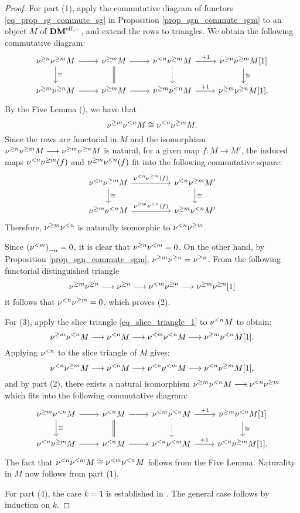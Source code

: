 \begin{proof}
For part (1), apply the commutative diagram of functors 
\eqref{eq_prop_sg_commute_sg} in Proposition 
\ref{prop_sgn_commute_sgm} to an object $M$ of $\DMeff$, and 
extend the rows to triangles. We obtain the following commutative 
diagram:
\[
\begin{tikzcd}
\sgDM{n} \sgDM{m} M \arrow{r} \arrow{d}{\cong} &
\sgDM{m} M \arrow{r} \arrow[equals]{d} &
\slDM{n} \sgDM{m} M \arrow{r}{+1} \arrow[dotted]{d} &
\sgDM{n} \sgDM{m} M[1] \arrow{d}{\cong}\\
\sgDM{m} \sgDM{n} M \arrow{r} &
\sgDM{m} M \arrow{r} &
\sgDM{m} \slDM{n} M \arrow{r}{+1} &
\sgDM{m} \sgDM{n} M[1].
\end{tikzcd}
\]
By the Five Lemma (\cite[10.2.2]{WH}), we have that
\[
\sgDM{m}\slDM{n} M \cong \slDM{n}\sgDM{m} M.
\]
Since the rows are functorial in $M$ and the isomorphism
$\sgDM{n} \sgDM{m} M \to \sgDM{m}\sgDM{n} M$ is natural,
for a given map $f: M \to M'$, the induced maps 
$\slDM{n}\sgDM{m}(f)$ and $\sgDM{m}\slDM{n}(f)$ fit into the 
following commutative square:
\[
\begin{tikzcd}[column sep=huge]
\slDM{n} \sgDM{m} M \arrow{r}{\slDM{n} \sgDM{m}(f)} \arrow{d}{\cong}
&\slDM{n} \sgDM{m} M' \arrow{d}{\cong} \\
\sgDM{m}\slDM{n} M \arrow{r}{\sgDM{m} \slDM{n}(f)} &
\sgDM{m}\slDM{n} M'
\end{tikzcd}
\]
Therefore, $\sgDM{m} \slDM{n}$ is naturally isomorphic to 
$\slDM{n} \sgDM{m}$.

Since $\hZ[n]{(\slDM{m})} = 0$, it is clear that
$\sgDM{n}\slDM{m} = 0$. On the other hand, by Proposition 
\ref{prop_sgn_commute_sgm}, $\sgDM{m}\sgDM{n} = \sgDM{n}$. From 
the following functorial distinguished triangle
\[
\sgDM{m} \sgDM{n} \to \sgDM{n} \to \slDM{m} \sgDM{n} \to \sgDM{m} 
   \sgDM{n}[1]
\]
it follows that $\slDM{n} \sgDM{m} = 0$, which proves (2).

For (3), apply the slice triangle \eqref{eq_slice_triangle_1} to
$\slDM{n} M$ to obtain:
\[
\sgDM{m} \slDM{n} M \to \slDM{n} M \to \slDM{m} \slDM{n} M \to
\sgDM{m} \slDM{n} M[1].
\]
Applying $\slDM{n}$ to the slice triangle of $M$ gives:
\[
\slDM{n} \sgDM{m} M \to \slDM{n} M \to \slDM{n} \slDM{m} M \to
\slDM{n} \sgDM{m} M[1],
\]
and by part (2), there exists a natural isomorphism $\sgDM{m} \slDM{n} M
\to \slDM{n} \sgDM{m}$ which fits into the following commutative
diagram:
\[
\begin{tikzcd}
\sgDM{m} \slDM{n} M \arrow{r} \arrow{d}{\cong} &
\slDM{n} M \arrow{r} \arrow[equals]{d} &
\slDM{m} \slDM{n} M \arrow{r}{+1} \arrow[dotted]{d} &
\sgDM{m} \slDM{n} M[1] \arrow{d}{\cong}\\
\slDM{n} \sgDM{m} M \arrow{r} &
\slDM{n} M \arrow{r} &
\slDM{n} \slDM{m} M \arrow{r}{+1} &
\slDM{n} \sgDM{m} M[1].
\end{tikzcd}
\]
The fact that $\slDM{n} \slDM{m} M \cong \slDM{m} \slDM{n} M$
follows from the Five Lemma. Naturality in $M$ now follows from
part (1).

For part (4), the case $k = 1$ is established in 
\cite[1.4(v)]{HuKa}. The general case follows by induction on 
$k$. \qedhere
\end{proof}


